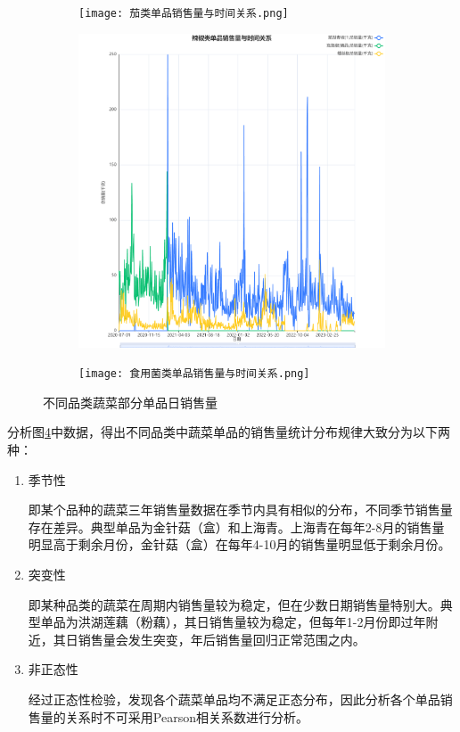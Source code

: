 \documentclass{my_paper}
\begin{document}
\begin{figure}[H]
    \begin{subfigure}{0.3\textwidth}
        \texttt{[image: 茄类单品销售量与时间关系.png]}
        \caption{}
        \label{fig:sub4}
    \end{subfigure}%
    \hfill
    \begin{subfigure}{0.3\textwidth}
        \includegraphics[width=\linewidth]{辣椒类单品销售量与时间关系.png}
        \caption{}
        \label{fig:sub5}
    \end{subfigure}%
    \hfill
    \begin{subfigure}{0.3\textwidth}
        \texttt{[image: 食用菌类单品销售量与时间关系.png]}
        \caption{}
        \label{fig:sub6}
    \end{subfigure}
    \caption{不同品类蔬菜部分单品日销售量}
    \label{不同品类蔬菜部分单品日销售量}
\end{figure}
分析图\ref{不同品类蔬菜部分单品日销售量}中数据，得出不同品类中蔬菜单品的销售量统计分布规律大致分为以下两种：
\begin{enumerate}
    \item 季节性\par
    即某个品种的蔬菜三年销售量数据在季节内具有相似的分布，不同季节销售量存在差异。典型单品为金针菇（盒）和上海青。上海青在每年2-8月的销售量明显高于剩余月份，金针菇（盒）在每年4-10月的销售量明显低于剩余月份。
    \item 突变性\par
    即某种品类的蔬菜在周期内销售量较为稳定，但在少数日期销售量特别大。典型单品为洪湖莲藕（粉藕），其日销售量较为稳定，但每年1-2月份即过年附近，其日销售量会发生突变，年后销售量回归正常范围之内。
    \item 非正态性\par
    经过正态性检验，发现各个蔬菜单品均不满足正态分布，因此分析各个单品销售量的关系时不可采用Pearson相关系数进行分析。
\end{enumerate}
\end{document}
